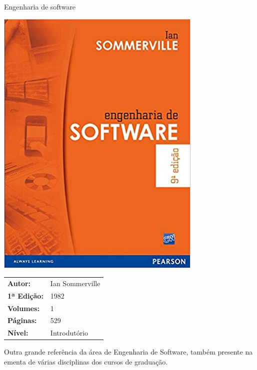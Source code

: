 \begin{frame}[fragile]{Engenharia de software}

    \begin{minipage}{0.4\textwidth}
        \includegraphics[scale=0.25]{sommerville.jpg}
    \end{minipage}
    \begin{minipage}{0.5\textwidth}
        \begin{small}
            \begin{tabularx}{0.95\textwidth}{lX}
                \textbf{Autor:} & Ian Sommerville \\
                \textbf{1ª Edição:} & 1982 \\
                \textbf{Volumes:} & 1 \\
                \textbf{Páginas:} & 529 \\
                \textbf{Nível:} & Introdutório \\
            \end{tabularx}
        \end{small}
    \end{minipage}

    \vspace{0.2in} 

    Outra grande referência da área de Engenharia de Software, também presente na ementa de
    várias disciplinas dos cursos de graduação.

\end{frame}

